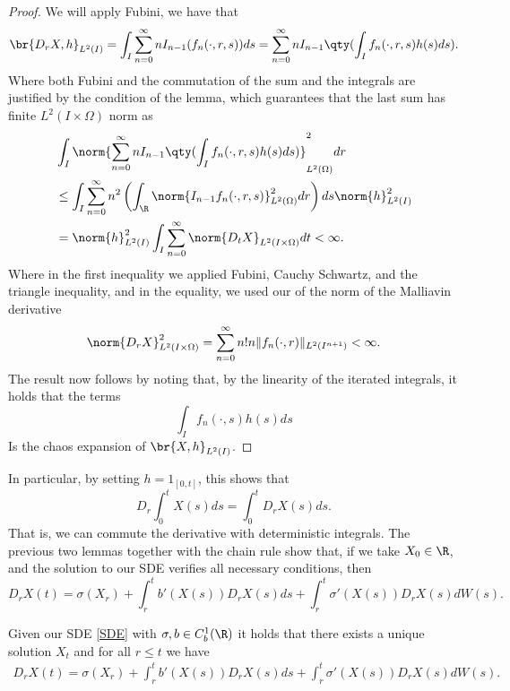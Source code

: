 \documentclass[
    a4paper,
    DIV=14,
    abstract=true,
    numbers=noenddot
]{scrartcl}
\begin{document}
\begin{proof}
	We will apply Fubini, we have that
	\begin{equation*}
		\br{D_rX,h}_{L^2(I)}=\int_I\sum_{n=0}^{\infty}nI_{n-1}(f_n(\cdot ,r,s))ds=\sum_{n=0}^{\infty}nI_{n-1}\qty(\int_If_n(\cdot ,r,s)h(s)ds).
	\end{equation*}
	Where both Fubini and the commutation of the sum and the integrals are justified by the condition of the lemma, which guarantees that the last sum has finite $L^2(I\times\Omega)$ norm as
	\begin{align*}
		&\int_{I} \norm{\sum_{n=0}^{\infty}nI_{n-1}\qty(\int_If_n(\cdot ,r,s)h(s)ds)}_{L^2(\Omega)}^2d r  \\
		&\leq \int_{I}\sum_{n=0}^{\infty}n^2 \left(\int_{\R}\norm{I_{n-1}f_n(\cdot ,r,s)}^2_{L^2(\Omega)}d r\right)ds \norm{h}^2_{L^2(I)}\\
		&=\norm{h}^2_{L^2(I)}\int_{I}\sum_{n=0}^{\infty}\norm{D_tX}_{L^2(I\times\Omega)}d t<\infty .
	\end{align*}
	Where in the first inequality we applied Fubini, Cauchy Schwartz, and the triangle inequality, and in the equality, we used our    of the norm of the Malliavin derivative
	\begin{equation*}
		\norm{D_rX}_{L^2(I\times\Omega)}^2=\sum_{n=0}^{\infty} n!n\|f_n(\cdot ,r )\|_{L^2(I^{n+1})}<\infty.
	\end{equation*}
	The result now follows by noting that, by the linearity of the iterated integrals, it holds that
	the terms
	\begin{equation*}
		\int_If_n(\cdot ,s)h(s)ds	\end{equation*}
	Is the chaos expansion of $\br{X,h}_{L^2(I)}$.
\end{proof}
In particular, by setting $h=1_{[0,t]}$, this shows that
\begin{equation*}
	D_r \int_{0}^t X(s)ds=\int_{0}^t D_rX(s) ds.
\end{equation*}
That is, we can commute the derivative with deterministic integrals. The previous two lemmas together with the chain rule show that, if we take $X_0\in \R$, and the solution to our SDE verifies all necessary conditions, then
\begin{equation*}
	D_rX(t)=\sigma(X_r)+\int_{r}^tb'(X(s))D_rX(s) ds+\int_{r}^t \sigma'(X(s))D_rX(s) dW(s) .
\end{equation*}
\begin{proposition}\label{maldersde}
	Given our SDE \eqref{SDE} with $\sigma ,b\in C^1_b(\R)$ it holds that there exists a unique solution $X_t$ and for all $r\leq t$ we have
	\begin{align*}
		D_rX(t)=\sigma(X_r)+\int_{r}^tb'(X(s))D_rX(s) ds+\int_{r}^t \sigma'(X(s))D_rX(s) dW(s) .
	\end{align*}
\end{proposition}
\end{document}

